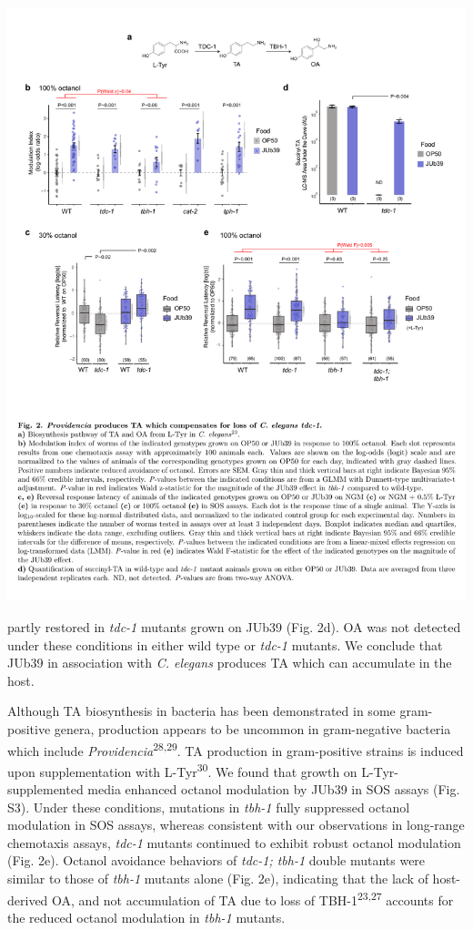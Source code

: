 \documentclass[11pt,]{article}
\begin{document}
\begin{center}\includegraphics[width=1\linewidth]{Figure2} \end{center}

\noindent partly restored in \emph{tdc-1} mutants grown on JUb39 (Fig.
2d). OA was not detected under these conditions in either wild type or
\emph{tdc-1} mutants. We conclude that JUb39 in association with
\emph{C. elegans} produces TA which can accumulate in the host.

Although TA biosynthesis in bacteria has been demonstrated in some
gram-positive genera, production appears to be uncommon in gram-negative
bacteria which include \emph{Providencia}\textsuperscript{28,29}. TA
production in gram-positive strains is induced upon supplementation with
L-Tyr\textsuperscript{30}. We found that growth on L-Tyr-supplemented
media enhanced octanol modulation by JUb39 in SOS assays (Fig. S3).
Under these conditions, mutations in \emph{tbh-1} fully suppressed
octanol modulation in SOS assays, whereas consistent with our
observations in long-range chemotaxis assays, \emph{tdc-1} mutants
continued to exhibit robust octanol modulation (Fig. 2e). Octanol
avoidance behaviors of \emph{tdc-1; tbh-1} double mutants were similar
to those of \emph{tbh-1} mutants alone (Fig. 2e), indicating that the
lack of host-derived OA, and not accumulation of TA due to loss of
TBH-1\textsuperscript{23,27} accounts for the reduced octanol modulation
in \emph{tbh-1} mutants.
\end{document}
